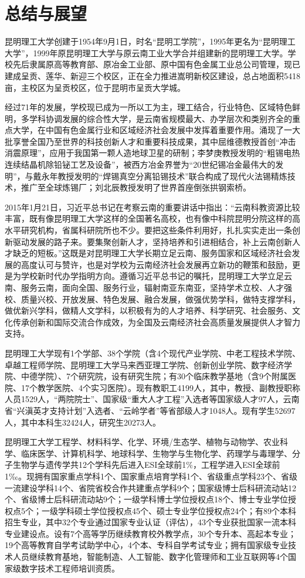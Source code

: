 \chapter{总结与展望}
昆明理工大学创建于1954年9月1日，时名“昆明工学院”，1995年更名为“昆明理工大学”，1999年原昆明理工大学与原云南工业大学合并组建新的昆明理工大学。学校先后隶属原高等教育部、原冶金工业部、原中国有色金属工业总公司管理，现已建成呈贡、莲华、新迎三个校区，正在全力推进嵩明新校区建设，总占地面积5418亩，主校区为呈贡校区，位于昆明市呈贡大学城。

经过71年的发展，学校现已成为一所以工为主，理工结合，行业特色、区域特色鲜明，多学科协调发展的综合性大学，是云南省规模最大、办学层次和类别齐全的重点大学，在中国有色金属行业和区域经济社会发展中发挥着重要作用。涌现了一大批享誉全国乃至世界的科技创新人才和重要科技成果，其中屈维德教授首创“冲击消震原理”，应用于我国第一颗人造地球卫星的研制；李梦庚教授发明的“粗锡电热连续结晶机除铅铋工艺及设备”，被西方冶金界誉为“20世纪锡冶金最伟大的发明”，与戴永年教授发明的“焊锡真空分离铅锡技术”联合构成了现代火法锡精炼技术，推广至全球炼锡厂；刘北辰教授发明了世界首座倒张拱钢索桥。

2015年1月21日，习近平总书记在考察云南的重要讲话中指出：“云南科教资源比较丰富，既有像昆明理工大学这样的全国著名高校，也有像中科院昆明分院这样的高水平研究机构，省属科研院所也不少。要把这些条件利用好，扎扎实实走出一条创新驱动发展的路子来。要集聚创新人才，坚持培养和引进相结合，补上云南创新人才缺乏的短板。”这既是对昆明理工大学长期立足云南、服务国家和区域经济社会发展的高度认可与赞许，也是对学校为云南经济社会发展再立新功的鞭策和鼓励，更是为学校新时代办学指明方向。遵循习近平总书记的嘱托，昆明理工大学立足云南、服务云南，面向全国、服务行业，辐射南亚东南亚，坚持学术立校、人才强校、质量兴校、开放发展、特色发展、融合发展，做强优势学科，做特支撑学科，做优新兴学科，做精人文学科，以积极有为的人才培养、科学研究、社会服务、文化传承创新和国际交流合作成效，为全国及云南经济社会高质量发展提供人才智力支持。

昆明理工大学现有1个学部、38个学院（含4个现代产业学院、中老工程技术学院、卓越工程师学院、昆明理工大学马来西亚理工学院、创新创业学院、数字经济学院、中德学院）、7个研究院，设有研究生院；有30个临床教学基地（含9个附属医院、17个教学医院、4个实习医院）。现有教职工4199人，其中，教授、副教授职称人员1529人，“两院院士”、国家级“重大人才工程”入选者等国家级人才97人，云南省“兴滇英才支持计划”入选者、“云岭学者”等省部级人才1048人。现有学生52697人，其中本科生32424人，研究生20273人。

昆明理工大学工程学、材料科学、化学、环境/生态学、植物与动物学、农业科学、临床医学、计算机科学、地球科学、生物学与生物化学、药理学与毒理学、分子生物学与遗传学共12个学科先后进入ESI全球前1\%，工程学进入ESI全球前1‰。现拥有国家重点学科1个、国家重点培育学科1个、省级重点学科23个、省级一流建设学科14个、省院省校合作共建重点学科9个；国家级博士后科研流动站12个、省级博士后科研流动站9个；一级学科博士学位授权点18个、博士专业学位授权点5个；一级学科硕士学位授权点45个、硕士专业学位授权点24个；有89个本科招生专业，其中32个专业通过国家专业认证（评估），43个专业获批国家一流本科专业建设点。设有7个高等学历继续教育校外教学点，30个专升本、高起本专业；19个高等教育自学考试助学中心，4个本、专科自学考试专业；拥有国家级专业技术人员继续教育基地，智能制造、人工智能、数字化管理师和工业互联网等4个国家级数字技术工程师培训资质。

